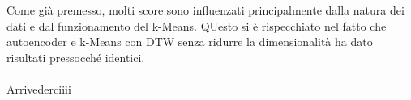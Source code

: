 Come già premesso, molti score sono influenzati principalmente dalla natura dei dati e dal funzionamento del k-Means. QUesto si è rispecchiato nel fatto che autoencoder e k-Means con DTW senza ridurre la dimensionalità ha dato risultati pressocché identici.\\
\\
Arrivederciiii